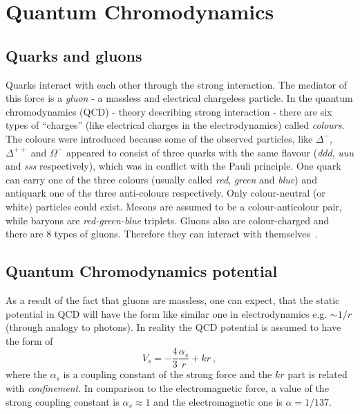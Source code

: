   \section{Quantum Chromodynamics}
    \subsection{Quarks and gluons}
      Quarks interact with each other through the strong interaction.
      The mediator of this force is a \textit{gluon} - a massless and electrical chargeless particle.
      In the quantum chromodynamics (QCD) - theory describing strong interaction - there are six types of ``charges'' (like electrical charges in the electrodynamics) called \textit{colours}.
      The colours were introduced because some of the observed particles, like $\Delta^{-}$, $\Delta^{++}$ and $\Omega^{-}$ appeared to consist of three quarks with the same flavour (\textit{ddd}, \textit{uuu} and \textit{sss} respectively), which was in conflict with the Pauli principle.
      One quark can carry one of the three colours (usually called \textit{red}, \textit{green} and \textit{blue}) and antiquark one of the three anti-colours respectively.
      Only colour-neutral (or white) particles could exist.
      Mesons are assumed to be a colour-anticolour pair, while baryons are \textit{red-green-blue} triplets.
      Gluons also are colour-charged and there are 8 types of gluons.
      Therefore they can interact with themselves~\cite{perkins}.
    \subsection{Quantum Chromodynamics potential}
      As a result of the fact that gluons are massless, one can expect, that the static potential in QCD will have the form like similar one in electrodynamics e.g. $\sim 1/r$ (through analogy to photons).
      In reality the QCD potential is assumed to have the form of~\cite{perkins}
      \begin{equation}
        V_s = - \frac{4}{3} \frac{\alpha_s}{r} + kr~,
        \label{eq:qcd_potential}
      \end{equation}
      where the $\alpha_s$ is a coupling constant of the strong force and the $kr$ part is related with \textit{confinement}.
      In comparison to the electromagnetic force, a value of the strong coupling constant is $\alpha_s \approx 1$ and the electromagnetic one is $\alpha = 1/137$.


